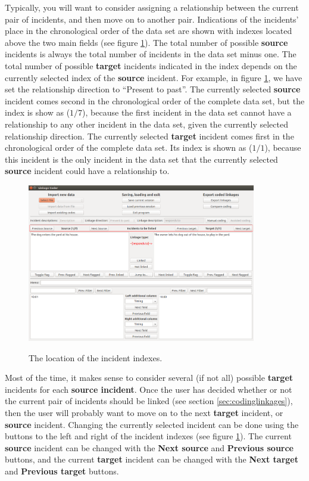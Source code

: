 \documentclass{memoir}
\begin{document}
Typically, you will want to consider assigning a relationship between the current pair of incidents, and then move on to another pair. Indications of the incidents' place in the chronological order of the data set are shown with indexes located above the two main fields (see figure \ref{fig:indexes}). The total number of possible \textbf{source} incidents is always the total number of incidents in the data set minus one. The total number of possible \textbf{target} incidents indicated in the index depends on the currently selected index of the \textbf{source} incident. For example, in figure \ref{fig:indexes}, we have set the relationship direction to ``Present to past''. The currently selected \textbf{source} incident comes second in the chronological order of the complete data set, but the index is show as (\(1 / 7\)), because the first incident in the data set cannot have a relationship to any other incident in the data set, given the currently selected relationship direction. The currently selected \textbf{target} incident comes first in the chronological order of the complete data set. Its index is shown as (\(1 / 1\)), because this incident is the only incident in the data set that the currently selected \textbf{source} incident could have a relationship to.    

\begin{figure}[h!]
  \centering
  \caption{The location of the incident indexes.}
  \includegraphics[width=100mm]{Screenshot_7.pdf}
  \label{fig:indexes}
\end{figure}

Most of the time, it makes sense to consider several (if not all) possible \textbf{target} incidents for each \textbf{source incident}. Once the user has decided whether or not the current pair of incidents should be linked (see section \ref{sec:codinglinkages}), then the user will probably want to move on to the next \textbf{target} incident, or \textbf{source} incident. Changing the currently selected incident can be done using the buttons to the left and right of the incident indexes (see figure \ref{fig:indexes}). The current \textbf{source} incident can be changed with the \textbf{Next source} and \textbf{Previous source} buttons, and the current \textbf{target} incident can be changed with the \textbf{Next target} and \textbf{Previous target} buttons.
\end{document}
